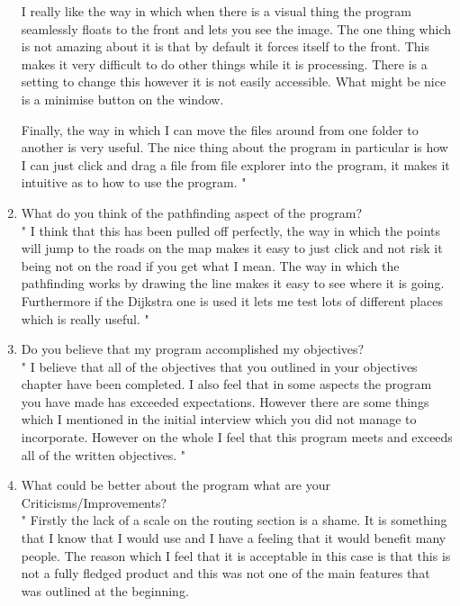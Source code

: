 \begin{flushleft}
\begin{enumerate}
        I really like the way in which when there is a visual thing the program seamlessly floats to the front and lets you see the image. The one thing which is not amazing about it is that by default it forces itself to the front. This makes it very difficult to do other things while it is processing. There is a setting to change this however it is not easily accessible. What might be nice is a minimise button on the window. \\ \bk

        Finally, the way in which I can move the files around from one folder to another is very useful. The nice thing about the program in particular is how I can just click and drag a file from file explorer into the program, it makes it intuitive as to how to use the program.
        "

        \item What do you think of the pathfinding aspect of the program? \\\bk
        "
        I think that this has been pulled off perfectly, the way in which the points will jump to the roads on the map makes it easy to just click and not risk it being not on the road if you get what I mean. The way in which the pathfinding works by drawing the line makes it easy to see where it is going. \\

        Furthermore if the Dijkstra one is used it lets me test lots of different places which is really useful.
        " 
    
        \item Do you believe that my program accomplished my objectives? \\\bk
        "
        I believe that all of the objectives that you outlined in your objectives chapter have been completed. I also feel that in some aspects the program you have made has exceeded expectations. However there are some things which I mentioned in the initial interview which you did not manage to incorporate. However on the whole I feel that this program meets and exceeds all of the written objectives.
        " 

        \item What could be better about the program what are your Criticisms/Improvements? \\\bk
        "
        Firstly the lack of a scale on the routing section is a shame. It is something that I know that I would use and I have a feeling that it would benefit many people. The reason which I feel that it is acceptable in this case is that this is not a fully fledged product and this was not one of the main features that was outlined at the beginning. \\ \bk


\end{enumerate}
\end{flushleft}
